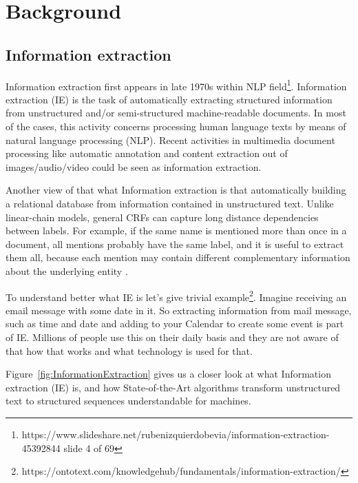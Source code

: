 \documentclass[thesis=M,english]{FITthesis}[2018/05/30]
\begin{document}
	
\section{Background}

\subsection{Information extraction}
	Information extraction first appears in late 1970s within NLP field\footnote{https://www.slideshare.net/rubenizquierdobevia/information-extraction-45392844 slide 4 of 69}. 
Information extraction (IE) \cite{wiki:IE} is the task of automatically extracting structured information from unstructured and/or semi-structured machine-readable documents. In most of the cases, this activity concerns processing human language texts by means of natural language processing (NLP). Recent activities in multimedia document processing like automatic annotation and content extraction out of images/audio/video could be seen as information extraction.

	Another view of that what Information extraction is that automatically building a relational database from information contained in unstructured text. Unlike linear-chain models, general CRFs can capture long distance dependencies between labels. For example, if the same name is mentioned more than once in a document, all mentions probably have the same label, and it is useful to extract them all, because each mention may contain different complementary information about the underlying entity \cite{article:IE}.

	To understand better what IE is let's give trivial example\footnote{https://ontotext.com/knowledgehub/fundamentals/information-extraction/}. Imagine receiving an email message with some date in it. So extracting information from mail message, such as time and date and adding to your Calendar to create some event is part of IE. Millions of people use this on their daily basis and they are not aware of that how that works and what technology is used for that.

	Figure~\ref{fig:InformationExtraction} gives us a closer look at what Information extraction (IE) is, and how State-of-the-Art algorithms transform unstructured text to structured sequences understandable for machines. 
\end{document}
